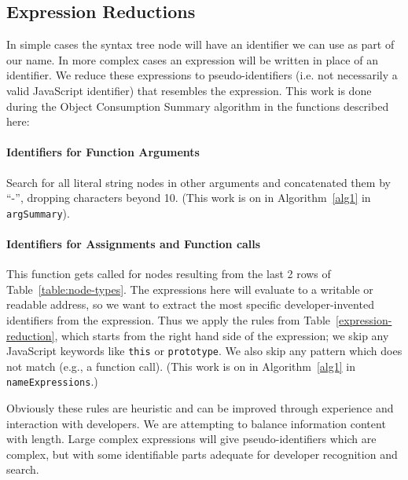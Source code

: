 \documentclass[10pt, preprint]{sigplanconf}
\begin{document}
\subsection{Expression Reductions}
\label{sec:general-element-naming}

In simple cases the syntax tree node will have an identifier we can use as part of our name. In more complex cases an expression will be written in place of an identifier. We reduce these expressions to pseudo-identifiers (i.e. not necessarily a valid JavaScript identifier) that resembles the expression. This work is done during the Object Consumption Summary algorithm in the functions described here:
\paragraph{Identifiers for Function Arguments} Search for all literal string nodes in other arguments and concatenated them by ``-'', dropping  characters beyond 10.  
 (This work is on in Algorithm~\ref{alg1} in \verb|argSummary|).
\paragraph{Identifiers for Assignments and Function calls} This function gets called for nodes resulting from the last 2 rows of Table~\ref{table:node-types}. The expressions here will evaluate to a writable or readable address, so we want to extract the most specific developer-invented identifiers from the expression. Thus we apply the rules from Table~\ref{expression-reduction}, which starts from the right hand side of the expression; we skip any JavaScript keywords like \texttt{this} or \texttt{prototype}. We also skip any pattern which does not match (e.g., a function call). (This work is on in Algorithm~\ref{alg1} in \verb|nameExpressions|.)

Obviously these rules are heuristic and can be improved through experience and interaction with developers. We are attempting to balance information content with length. Large complex expressions will give pseudo-identifiers which are complex, but with some identifiable parts adequate for developer recognition and search.
\end{document}
